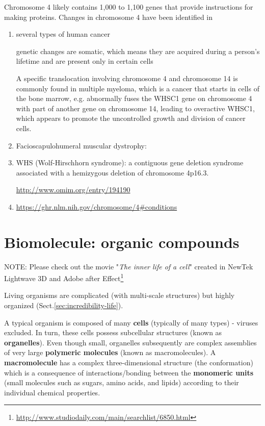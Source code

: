 Chromosome 4 likely contains 1,000 to 1,100 genes that provide instructions for
making proteins. Changes in chromosome 4 have been identified in
\begin{enumerate}
  \item several types of human cancer

genetic changes are somatic, which means they are acquired during a person's
lifetime and are present only in certain cells

A specific translocation involving chromosome 4 and chromosome 14 is commonly
found in multiple myeloma, which is a cancer that starts in cells of the bone
marrow, e.g. abnormally fuses the WHSC1 gene on chromosome 4 with part of
another gene on chromosome 14, leading to overactive WHSC1, which appears to
promote the uncontrolled growth and division of cancer cells.
  
  \item Facioscapulohumeral muscular dystrophy:  

  \item WHS (Wolf-Hirschhorn syndrome):
  a contiguous gene deletion syndrome associated with a hemizygous deletion of
  chromosome 4p16.3.
  
  \url{http://www.omim.org/entry/194190}
  
  
  \item \url{https://ghr.nlm.nih.gov/chromosome/4#conditions}
\end{enumerate}


\section{Biomolecule: organic compounds}
\label{sec:living-organisms}
\label{sec:biomolecule}

NOTE: Please check out the movie "{\it The inner life of a cell}" created in
NewTek Lightwave 3D and Adobe after
Effect\footnote{\url{http://www.studiodaily.com/main/searchlist/6850.html}}

\begin{framed}
  Living organisms are complicated (with multi-scale structures) but highly
  organized (Sect.\ref{sec:incredibility-life}).
\end{framed}

A typical organism is composed of many {\bf cells} (typically of many types)  -
viruses excluded. In turn, these cells possess subcellular structures (known as
{\bf organelles}). Even though small, organelles subsequently are complex
assemblies of very large {\bf polymeric molecules} (known as macromolecules).
A {\bf macromolecule} has a complex three-dimensional structure (the
conformation) which is a consequence of interactions/bonding between the {\bf
monomeric units} (small molecules such as sugars, amino acids, and lipids)
according to their individual chemical properties.

